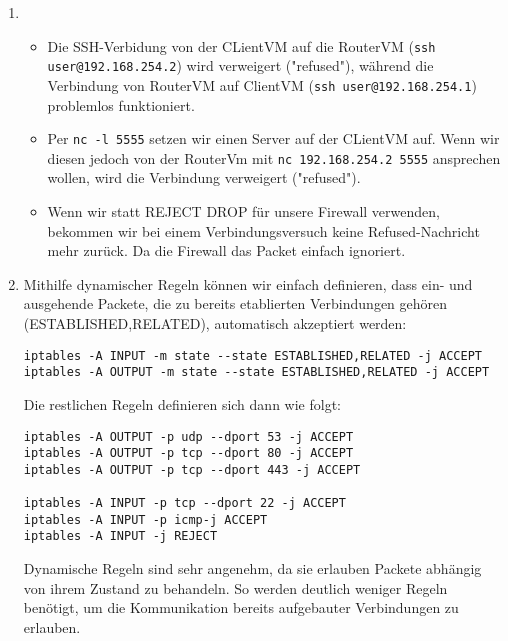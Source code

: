 \documentclass{scrartcl}
\begin{document}
\begin{enumerate}[\bfseries 1.]
        \item
            \begin{itemize}
                \item Die SSH-Verbidung von der CLientVM auf die RouterVM
                      (\texttt{ssh user@192.168.254.2}) wird verweigert ("refused"),
                      während die Verbindung von RouterVM auf ClientVM
                      (\texttt{ssh user@192.168.254.1}) problemlos funktioniert.
                \item Per \texttt{nc -l 5555} setzen wir einen Server auf der CLientVM
                      auf. Wenn wir diesen jedoch von der RouterVm mit
                      \texttt{nc 192.168.254.2 5555} ansprechen wollen, wird die
                      Verbindung verweigert ("refused").
                \item Wenn wir statt REJECT DROP für unsere Firewall verwenden,
                      bekommen wir bei einem Verbindungsversuch keine Refused-Nachricht
                      mehr zurück. Da die Firewall das Packet einfach ignoriert.
            \end{itemize}

        \item Mithilfe dynamischer Regeln können wir einfach definieren, dass ein- und
              ausgehende Packete, die zu bereits etablierten Verbindungen gehören
              (ESTABLISHED,RELATED), automatisch akzeptiert werden:
              \begin{lstlisting}
iptables -A INPUT -m state --state ESTABLISHED,RELATED -j ACCEPT
iptables -A OUTPUT -m state --state ESTABLISHED,RELATED -j ACCEPT
              \end{lstlisting}
              Die restlichen Regeln definieren sich dann wie folgt:
              \begin{lstlisting}[]
iptables -A OUTPUT -p udp --dport 53 -j ACCEPT
iptables -A OUTPUT -p tcp --dport 80 -j ACCEPT
iptables -A OUTPUT -p tcp --dport 443 -j ACCEPT

iptables -A INPUT -p tcp --dport 22 -j ACCEPT
iptables -A INPUT -p icmp-j ACCEPT
iptables -A INPUT -j REJECT
              \end{lstlisting}
              Dynamische Regeln sind sehr angenehm, da sie erlauben Packete abhängig
              von ihrem Zustand zu behandeln. So werden deutlich weniger Regeln benötigt,
              um die Kommunikation bereits aufgebauter Verbindungen zu erlauben.
    \end{enumerate}
\end{document}

